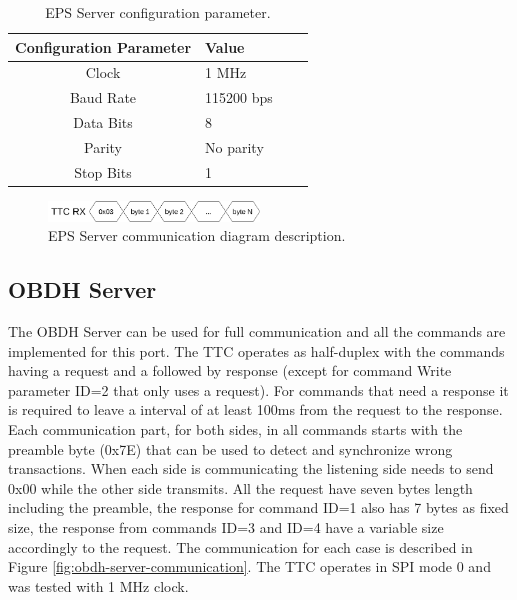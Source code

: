\begin{table}[!ht]
    \centering
    \begin{tabular}{clll}
        \toprule[1.5pt]
        \textbf{Configuration Parameter} & \textbf{Value}\\
        \midrule
        Clock               & 1 MHz       \\
        Baud Rate           & 115200 bps  \\
        Data Bits           & 8           \\
        Parity              & No parity   \\
        Stop Bits           & 1           \\
        \bottomrule[1.5pt]
    \end{tabular}
    \caption{EPS Server configuration parameter.}
    \label{tab:eps_config}
\end{table}

\begin{figure}[!ht]
    \begin{center}
        \includegraphics[width=0.5\textwidth]{figures/eps_communication.drawio.png}
        \caption{EPS Server communication diagram description.}
        \label{fig:eps-server-communication}
    \end{center}
\end{figure}

\subsection{OBDH Server}
The OBDH Server can be used for full communication and all the commands are implemented for this port. The TTC operates as half-duplex with the commands having a request and a followed by response (except for command Write parameter ID=2 that only uses a request). For commands that need a response it is required to leave a interval of at least 100ms from the request to the response. Each communication part, for both sides, in all commands starts with the preamble byte (0x7E) that can be used to detect and synchronize wrong transactions. When each side is communicating the listening side needs to send 0x00 while the other side transmits.
All the request have seven bytes length including the preamble, the response for command ID=1 also has 7 bytes as fixed size, the response from commands ID=3 and ID=4 have a variable size accordingly to the request. The communication for each case is described in Figure \ref{fig:obdh-server-communication}. The TTC operates in SPI mode 0 and was tested with 1 MHz clock.

